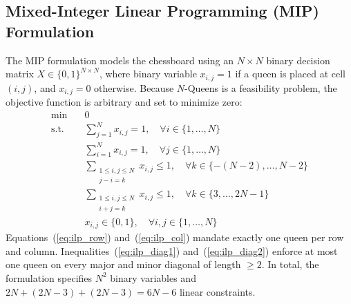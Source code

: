 \documentclass[a4paper,fleqn]{cas-sc}
\begin{document}
\subsection{Mixed-Integer Linear Programming (MIP) Formulation}
\label{subsec:mip_formulation}
The MIP formulation models the chessboard using an $N \times N$ binary decision matrix $X \in \{0, 1\}^{N \times N}$, where binary variable $x_{i,j} = 1$ if a queen is placed at cell $(i, j)$, and $x_{i,j} = 0$ otherwise. Because $N$-Queens is a feasibility problem, the objective function is arbitrary and set to minimize zero:
\begin{align}
    \min \quad & 0 \label{eq:ilp_obj} \\
    \text{s.t.} \quad & \sum_{j=1}^{N} x_{i,j} = 1, \quad \forall i \in \{1, \dots, N\} \label{eq:ilp_row} \\
    & \sum_{i=1}^{N} x_{i,j} = 1, \quad \forall j \in \{1, \dots, N\} \label{eq:ilp_col} \\
    & \sum_{\substack{1 \le i, j \le N \\ j - i = k}} x_{i,j} \le 1, \quad \forall k \in \{-(N-2), \dots, N-2\} \label{eq:ilp_diag1} \\
    & \sum_{\substack{1 \le i, j \le N \\ i + j = k}} x_{i,j} \le 1, \quad \forall k \in \{3, \dots, 2N-1\} \label{eq:ilp_diag2} \\
    & x_{i,j} \in \{0, 1\}, \quad \forall i, j \in \{1, \dots, N\} \label{eq:ilp_var}
\end{align}
Equations~(\ref{eq:ilp_row}) and~(\ref{eq:ilp_col}) mandate exactly one queen per row and column. Inequalities~(\ref{eq:ilp_diag1}) and~(\ref{eq:ilp_diag2}) enforce at most one queen on every major and minor diagonal of length $\ge 2$. In total, the formulation specifies $N^2$ binary variables and $2N + (2N - 3) + (2N - 3) = 6N - 6$ linear constraints.
\end{document}
